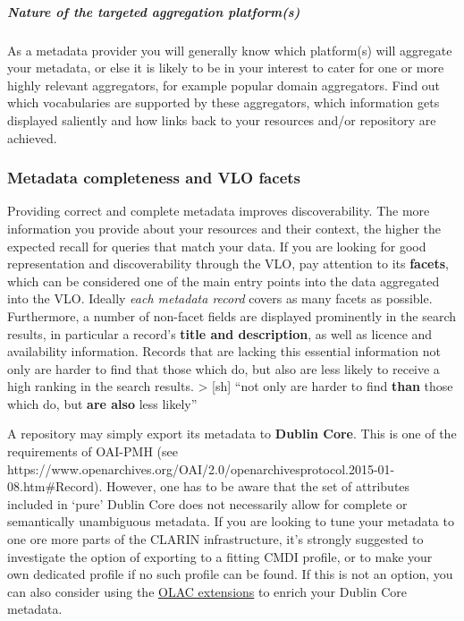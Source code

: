 \documentclass[]{article}
\let\oldsubparagraph\subparagraph
\renewcommand{\subparagraph}[1]{\oldsubparagraph{#1}\mbox{}}
\begin{document}
\subparagraph{Nature of the targeted aggregation
platform(s)}\label{nature-of-the-targeted-aggregation-platforms}

As a metadata provider you will generally know which platform(s) will
aggregate your metadata, or else it is likely to be in your interest to
cater for one or more highly relevant aggregators, for example popular
domain aggregators. Find out which vocabularies are supported by these
aggregators, which information gets displayed saliently and how links
back to your resources and/or repository are achieved.

\subsubsection{Metadata completeness and VLO
facets}\label{metadata-completeness-and-vlo-facets}

Providing correct and complete metadata improves discoverability. The
more information you provide about your resources and their context, the
higher the expected recall for queries that match your data. If you are
looking for good representation and discoverability through the VLO, pay
attention to its \textbf{facets}, which can be considered one of the
main entry points into the data aggregated into the VLO. Ideally
\emph{each metadata record} covers as many facets as possible.
Furthermore, a number of non-facet fields are displayed prominently in
the search results, in particular a record's \textbf{title and
description}, as well as licence and availability information. Records
that are lacking this essential information not only are harder to find
that those which do, but also are less likely to receive a high ranking
in the search results. \textgreater{} {[}sh{]} ``not only are harder to
find \textbf{than} those which do, but \textbf{are also} less likely''

A repository may simply export its metadata to \textbf{Dublin Core}.
This is one of the requirements of OAI-PMH (see
https://www.openarchives.org/OAI/2.0/openarchivesprotocol.2015-01-08.htm\#Record).
However, one has to be aware that the set of attributes included in
`pure' Dublin Core does not necessarily allow for complete or
semantically unambiguous metadata. If you are looking to tune your
metadata to one ore more parts of the CLARIN infrastructure, it's
strongly suggested to investigate the option of exporting to a fitting
CMDI profile, or to make your own dedicated profile if no such profile
can be found. If this is not an option, you can also consider using the
\href{http://www.language-archives.org/OLAC/metadata.html}{OLAC
extensions} to enrich your Dublin Core metadata.
\end{document}
